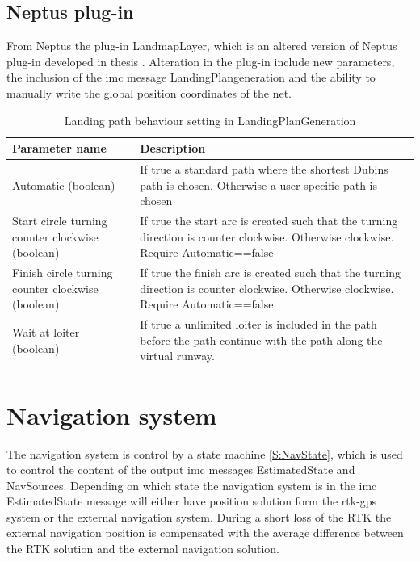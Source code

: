 \subsection{Neptus plug-in}
From Neptus the plug-in LandmapLayer, which is an altered version of Neptus plug-in developed in thesis \citep{Froelich}. Alteration in the plug-in include new parameters, the inclusion of the \gls{imc} message LandingPlangeneration and the ability to manually write the global position coordinates of the net.
\begin{table}
\centering
\begin{tabular}{| p{2.7cm} | | p{6cm} |}
\hline
\textbf{Parameter name} 							& \textbf{Description} \\ \hline
 Automatic (boolean)								& If true a standard path where the shortest Dubins path is chosen. Otherwise a user specific path is chosen \\ \hline
Start circle turning counter clockwise (boolean)	& If true the start arc is created such that the turning direction is counter clockwise. Otherwise clockwise. Require Automatic==false \\ \hline
Finish circle turning counter clockwise (boolean)	& If true the finish arc is created such that the turning direction is counter clockwise. Otherwise clockwise. Require Automatic==false \\ \hline
Wait at loiter (boolean)							& If true a unlimited loiter is included in the path before the path continue with the path along the virtual runway. \\ \hline

\end{tabular}
\caption{Landing path behaviour setting in LandingPlanGeneration}
\label{Tb:DubinConfig}
\end{table}
\section{Navigation system}
The navigation system is control by a state machine \ref{S:NavState}, which is used to control the content of the output \gls{imc} messages EstimatedState and NavSources. Depending on which state the navigation system is in the \gls{imc} EstimatedState message will either have position solution form the \gls{rtk-gps} system or the external navigation system. During a short loss of the RTK the external navigation position is compensated with the average difference between the RTK solution and the external navigation solution.
